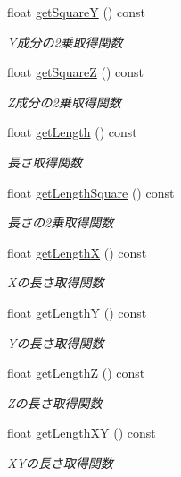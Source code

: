 \begin{DoxyCompactItemize}
float \mbox{\hyperlink{class_vector3_d_a367f48b718d547de44789f1bedfa57a5}{get\+SquareY}} () const
\begin{DoxyCompactList}\small\item\em Y成分の2乗取得関数 \end{DoxyCompactList}\item 
float \mbox{\hyperlink{class_vector3_d_ae38a3a196d197225be9a53110e4210ea}{get\+SquareZ}} () const
\begin{DoxyCompactList}\small\item\em Z成分の2乗取得関数 \end{DoxyCompactList}\item 
float \mbox{\hyperlink{class_vector3_d_a21323e4bb404b4fe11528b574d44c3d4}{get\+Length}} () const
\begin{DoxyCompactList}\small\item\em 長さ取得関数 \end{DoxyCompactList}\item 
float \mbox{\hyperlink{class_vector3_d_ab125e8573d80809abed3dba11c5b520b}{get\+Length\+Square}} () const
\begin{DoxyCompactList}\small\item\em 長さの2乗取得関数 \end{DoxyCompactList}\item 
float \mbox{\hyperlink{class_vector3_d_a83f6e201a88329e7d4e966045ce4c535}{get\+LengthX}} () const
\begin{DoxyCompactList}\small\item\em Xの長さ取得関数 \end{DoxyCompactList}\item 
float \mbox{\hyperlink{class_vector3_d_a0f475f8ffd361c5571bc57cb0c72a551}{get\+LengthY}} () const
\begin{DoxyCompactList}\small\item\em Yの長さ取得関数 \end{DoxyCompactList}\item 
float \mbox{\hyperlink{class_vector3_d_a534136a09ed7f995ae559687b12f38a1}{get\+LengthZ}} () const
\begin{DoxyCompactList}\small\item\em Zの長さ取得関数 \end{DoxyCompactList}\item 
float \mbox{\hyperlink{class_vector3_d_a59f0095984eee6b0cdb72f1da7647a57}{get\+Length\+XY}} () const
\begin{DoxyCompactList}\small\item\em X\+Yの長さ取得関数 \end{DoxyCompactList}\item 

\end{DoxyCompactItemize}
